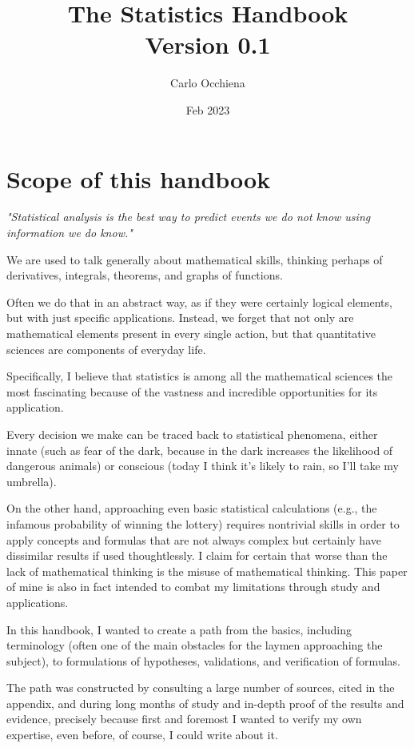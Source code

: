 \documentclass{article}
\title{The Statistics Handbook \\ 
    \normalsize Version 0.1}
\author{ Carlo Occhiena }
\date{ Feb 2023 }
\begin{document}
\fancyhead{}
\setlength{\headheight}{13.6pt}
\pagestyle{fancy}
\rhead[]{\rightmark} %

\maketitle
\tableofcontents
\clearpage

\section{Scope of this handbook}
\emph{"Statistical analysis is the best way to predict events we do not know using information we do know."} 


We are used to talk generally about mathematical skills, thinking perhaps of derivatives, integrals, theorems, and graphs of functions. 

Often we do that in an abstract way, as if they were certainly logical elements, but with just specific applications. Instead, we forget that not only are mathematical elements present in every single action, but that quantitative sciences are components of everyday life.

Specifically, I believe that statistics is among all the mathematical sciences the most fascinating because of the vastness and incredible opportunities for its application. 

Every decision we make can be traced back to statistical phenomena, either innate (such as fear of the dark, because in the dark increases the likelihood of dangerous animals) or conscious (today I think it's likely to rain, so I'll take my umbrella). 

On the other hand, approaching even basic statistical calculations (e.g., the infamous probability of winning the lottery) requires nontrivial skills in order to apply concepts and formulas that are not always complex but certainly have dissimilar results if used thoughtlessly. I claim for certain that worse than the lack of mathematical thinking is the misuse of mathematical thinking. This paper of mine is also in fact intended to combat my limitations through study and applications. 

In this handbook, I wanted to create a path from the basics, including terminology (often one of the main obstacles for the laymen approaching the subject), to formulations of hypotheses, validations, and verification of formulas.

The path was constructed by consulting a large number of sources, cited in the appendix, and during long months of study and in-depth proof of the results and evidence, precisely because first and foremost I wanted to verify my own expertise, even before, of course, I could write about it. 
\end{document}
